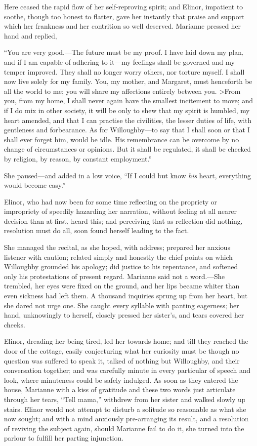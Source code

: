 Here ceased the rapid flow of her self-reproving spirit;
and Elinor, impatient to soothe, though too honest
to flatter, gave her instantly that praise and support
which her frankness and her contrition so well deserved.
Marianne pressed her hand and replied,

``You are very good.---The future must be my proof.
I have laid down my plan, and if I am capable of adhering
to it---my feelings shall be governed and my temper improved.
They shall no longer worry others, nor torture myself.
I shall now live solely for my family.  You, my mother,
and Margaret, must henceforth be all the world to me;
you will share my affections entirely between you.
>From you, from my home, I shall never again have the smallest
incitement to move; and if I do mix in other society,
it will be only to shew that my spirit is humbled,
my heart amended, and that I can practise the civilities,
the lesser duties of life, with gentleness and forbearance.
As for Willoughby---to say that I shall soon or that I shall
ever forget him, would be idle.  His remembrance can be overcome
by no change of circumstances or opinions.  But it shall
be regulated, it shall be checked by religion, by reason,
by constant employment.''

She paused---and added in a low voice, ``If I could
but know \emph{his} heart, everything would become easy.''

Elinor, who had now been for some time reflecting
on the propriety or impropriety of speedily hazarding
her narration, without feeling at all nearer decision than
at first, heard this; and perceiving that as reflection
did nothing, resolution must do all, soon found herself
leading to the fact.

She managed the recital, as she hoped, with address;
prepared her anxious listener with caution; related simply
and honestly the chief points on which Willoughby
grounded his apology; did justice to his repentance,
and softened only his protestations of present regard.
Marianne said not a word.---She trembled, her eyes
were fixed on the ground, and her lips became whiter
than even sickness had left them.  A thousand inquiries
sprung up from her heart, but she dared not urge one.
She caught every syllable with panting eagerness; her hand,
unknowingly to herself, closely pressed her sister's, and
tears covered her cheeks.

Elinor, dreading her being tired, led her towards home;
and till they reached the door of the cottage,
easily conjecturing what her curiosity must be
though no question was suffered to speak it, talked of
nothing but Willoughby, and their conversation together;
and was carefully minute in every particular of speech
and look, where minuteness could be safely indulged.
As soon as they entered the house, Marianne with a kiss
of gratitude and these two words just articulate through
her tears, ``Tell mama,'' withdrew from her sister and
walked slowly up stairs.  Elinor would not attempt
to disturb a solitude so reasonable as what she now sought;
and with a mind anxiously pre-arranging its result,
and a resolution of reviving the subject again,
should Marianne fail to do it, she turned into the parlour
to fulfill her parting injunction.



